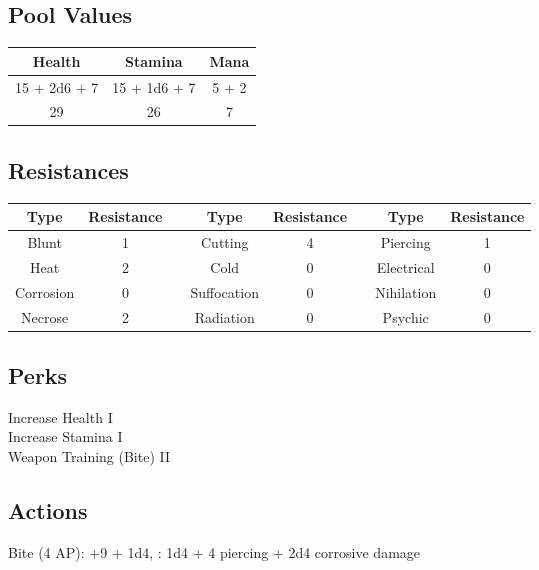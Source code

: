 \subsection{Pool Values}
\bigbreak
\begin{minipage}[H]{1\textwidth}
    \centering
    \begin{tabular}[c]{|c | c | c|}
        \hline
        Health & Stamina & Mana\\
        \hline
        15 + 2d6 + 7 & 15 + 1d6 + 7 & 5 + 2 \\
        29 & 26 & 7\\
        \hline
    \end{tabular}
\end{minipage}
\noindent

\subsection{Resistances}
\begin{minipage}[H]{1\textwidth}
    \centering
    \begin{tabular}[c]{|c | c | c | c | c | c | c | c|}
        \hline
        Type & Resistance && Type & Resistance && Type & Resistance\\
        \hline
        Blunt & 1 &&
        Cutting & 4 &&
        Piercing & 1\\
        Heat & 2 &&
        Cold & 0 &&
        Electrical & 0\\
        Corrosion & 0 &&
        Suffocation & 0 &&
        Nihilation & 0 \\
        Necrose & 2 &&
        Radiation & 0 &&
        Psychic & 0\\
        \hline
    \end{tabular}
\end{minipage}

\subsection{Perks}
Increase Health I\\
Increase Stamina I\\
Weapon Training (Bite) II\\

\subsection{Actions}
Bite (4 AP): +9 + 1d4, : 1d4 + 4 piercing + 2d4 corrosive damage\\


